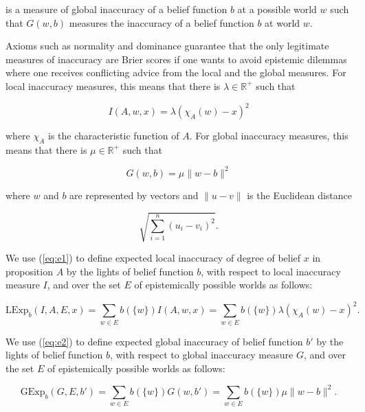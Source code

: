 \documentclass[phd,12pt,oneside]{ubcthesis}
\begin{document}
{\noindent}is a measure of global inaccuracy of a belief function $b$
at a possible world $w$ such that $G(w,b)$ measures the inaccuracy of
a belief function $b$ at world $w$.

Axioms such as normality and dominance guarantee that the only
legitimate measures of inaccuracy are Brier scores if one wants to
avoid epistemic dilemmas where one receives conflicting advice from
the local and the global measures. For local inaccuracy measures, this
means that there is $\lambda\in\mathbb{R}^{+}$ such that

\begin{equation}
  \label{eq:e1}
  I(A,w,x)=\lambda\left(\chi_{A}(w)-x\right)^{2}
\end{equation}

{\noindent}where $\chi_{A}$ is the characteristic function of $A$. For global
inaccuracy measures, this means that there is $\mu\in\mathbb{R}^{+}$
such that

\begin{equation}
  \label{eq:e2}
  G(w,b)=\mu\|w-b\|^{2}
\end{equation}

where $w$ and $b$ are represented by vectors and $\|u-v\|$ is the
Euclidean distance

\begin{equation}
  \label{eq:e3}
  \sqrt{\sum_{i=1}^{n}\left(u_{i}-v_{i}\right)^{2}}.
\end{equation}

We use (\ref{eq:e1}) to define expected local inaccuracy of degree of
belief $x$ in proposition $A$ by the lights of belief function $b$,
with respect to local inaccuracy measure $I$, and over the set $E$ of
epistemically possible worlds as follows:

\begin{equation}
  \label{eq:eli}
  \mbox{LExp}_{b}(I,A,E,x)=\sum_{w\in{}E}b(\{w\})I(A,w,x)=\sum_{w\in{}E}b(\{w\})\lambda\left(\chi_{A}(w)-x\right)^{2}.
\end{equation}

We use (\ref{eq:e2}) to define expected global inaccuracy of belief
function $b'$ by the lights of belief function $b$, with respect to
global inaccuracy measure $G$, and over the set $E$ of epistemically
possible worlds as follows:

\begin{equation}
  \label{eq:egi}
  \mbox{GExp}_{b}(G,E,b')=\sum_{w\in{}E}b(\{w\})G(w,b')=\sum_{w\in{}E}b(\{w\})\mu\|w-b\|^{2}.
\end{equation}
\end{document}
